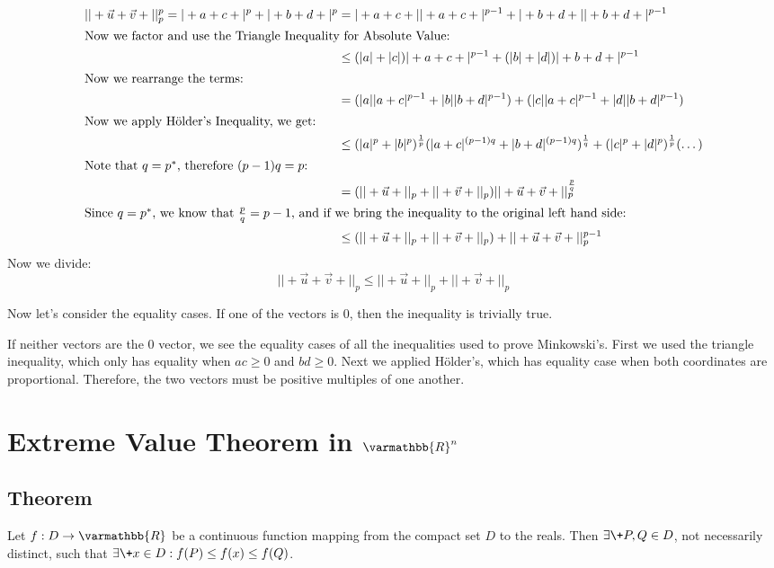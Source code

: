 \documentclass[11 pt, twoside]{article}
\begin{document}
\begin{align*}
||+\vec{u} + \vec{v}+||_p^p = |+a + c+|^p + |+b + d+|^p &= |+a + c+||+a + c+|^{p - 1} + |+b + d+||+b + d+|^{p - 1}\\
\intertext{Now we factor and use the Triangle Inequality for Absolute Value:}
&\leq (|a| + |c|)|+a + c+|^{p - 1} + (|b| + |d|)|+b + d+|^{p - 1}\\
\intertext{Now we rearrange the terms:}
&= (|a||a + c|^{p - 1} + |b||b + d|^{p - 1}) + (|c||a + c|^{p - 1} + |d||b +
d|^{p - 1})\\
\intertext{Now we apply H\"{o}lder's Inequality, we get:}
&\leq (|a|^p + |b|^p)^{\frac{1}{p}}(|a + c|^{(p - 1)q} + |b + d|^{(p -
1)q})^{\frac{1}{q}} + (|c|^p + |d|^p)^{\frac{1}{p}}(\dots)\\
\intertext{Note that $q = p^*$, therefore $(p - 1)q = p$:}
&= (||+\vec{u}+||_p + ||+\vec{v}+||_p) ||+\vec{u} + \vec{v}+||_p^{\frac{p}{q}}\\
\intertext{Since $q = p^*$, we know that $\frac{p}{q} = p - 1$, and if we bring the
inequality to the original left hand side:}
&\leq (||+\vec{u}+||_p + ||+\vec{v}+||_p)+||+\vec{u} + \vec{v}+||_p^{p - 1}
\end{align*}
Now we divide:
$$||+\vec{u} + \vec{v}+||_p \leq ||+\vec{u}+||_p + ||+\vec{v}+||_p$$

Now let's consider the equality cases. If one of the vectors is 0, then the
inequality is trivially true.

If neither vectors are the 0 vector, we see the equality cases of all the
inequalities used to prove Minkowski's. First we used the triangle inequality,
which only has equality when $ac \geq 0$ and $bd \geq 0$. Next we applied
H\"{o}lder's, which has equality case when both coordinates are proportional.
Therefore, the two vectors must be positive multiples of one another.

\section{Extreme Value Theorem in $\varmathbb{R}^n$}
\subsection{Theorem}
Let $f : D \to \varmathbb{R}$ be a continuous function mapping from the compact
set $D$ to the reals. Then $\exists\+ P, Q \in D$, not necessarily distinct,
such that $\exists\+ x \in D: f(P) \leq f(x) \leq f(Q)$.
\end{document}
